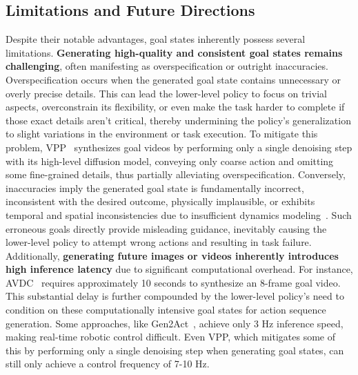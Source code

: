 \documentclass[10pt, a4paper, logo, copyright]{googledeepmind} %
\begin{document}
\subsection{Limitations and Future Directions}
Despite their notable advantages, goal states inherently possess several limitations. 
\textbf{Generating high-quality and consistent goal states remains challenging}, often manifesting as overspecification or outright inaccuracies. Overspecification occurs when the generated goal state contains unnecessary or overly precise details. This can lead the lower-level policy to focus on trivial aspects, overconstrain its flexibility, or even make the task harder to complete if those exact details aren't critical, thereby undermining the policy's generalization to slight variations in the environment or task execution. To mitigate this problem, VPP~\cite{hu2025videopredictionpolicygeneralist} synthesizes goal videos by performing only a single denoising step with its high-level diffusion model, conveying only coarse action and omitting some fine-grained details, thus partially alleviating overspecification. Conversely, inaccuracies imply the generated goal state is fundamentally incorrect, inconsistent with the desired outcome, physically implausible, or exhibits temporal and spatial inconsistencies due to insufficient dynamics modeling~\cite{zhang2025gevrmgoalexpressivevideogeneration}. Such erroneous goals directly provide misleading guidance, inevitably causing the lower-level policy to attempt wrong actions and resulting in task failure. 
Additionally, \textbf{generating future images or videos inherently introduces high inference latency} due to significant computational overhead. For instance, AVDC~\cite{ko2023avdc} requires approximately 10 seconds to synthesize an 8-frame goal video. This substantial delay is further compounded by the lower-level policy's need to condition on these computationally intensive goal states for action sequence generation. Some approaches, like Gen2Act~\cite{bharadhwaj2024gen2acthumanvideogeneration}, achieve only 3 Hz inference speed, making real-time robotic control difficult. Even VPP, which mitigates some of this by performing only a single denoising step when generating goal states, can still only achieve a control frequency of 7-10 Hz.
\end{document}
